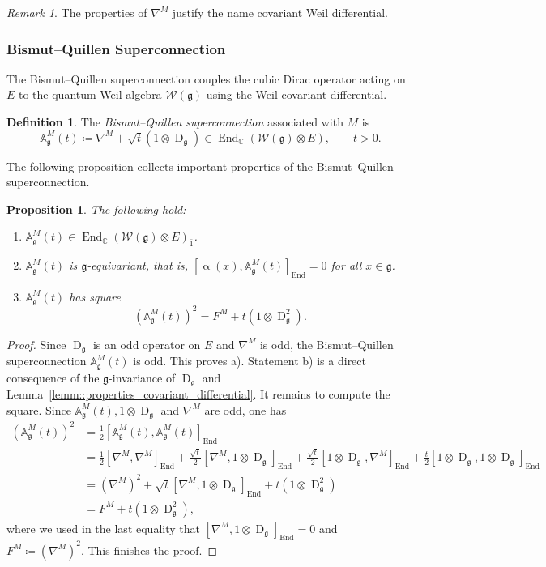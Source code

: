 \documentclass[11pt]{amsart}
\newcommand{\End}{\operatorname{End}}
\newcommand{\Dirac}{\operatorname{D}}
\def\gg{{\mathfrak{g}}}
\theoremstyle{plain}
\newtheorem{proposition}[theorem]{Proposition}
\theoremstyle{remark}
\theoremstyle{definition}
\newtheorem{definition}[theorem]{Definition}
\numberwithin{equation}{section}
\theoremstyle{remark}
\newtheorem{remark}[theorem]{Remark}
\begin{document}
\begin{remark}
 The properties of $\nabla^{M}$ justify the name covariant Weil differential.
\end{remark}

\subsubsection{Bismut--Quillen Superconnection}
The Bismut--Quillen superconnection couples the cubic Dirac operator acting on $E$ to the quantum Weil algebra $\mathcal{W}(\gg)$ using the Weil covariant differential.

\begin{definition}
 The \emph{Bismut--Quillen superconnection} associated with $M$ is 
 \[
 \mathbb{A}_{\gg}^{M}(t)\coloneqq \nabla^{M} + \sqrt{t} (1\otimes \Dirac_{\gg}) \in \End_{\mathbb{C}}(\mathcal{W}(\gg) \otimes E), \qquad t>0.
 \]
\end{definition}

The following proposition collects important properties of the Bismut--Quillen superconnection.

\begin{proposition}\label{prop::prperties_AM_absolute} The following hold:
\begin{enumerate}
\item[a)] $\mathbb{A}^{\!M}_{\gg}(t) \in \End_{\mathbb{C}}(\mathcal{W}(\gg)\otimes E)_{\bar{1}}$.
 \item[b)] $\mathbb{A}^{\!M}_{\gg}(t)$ is $\gg$-equivariant, that is, $[\upalpha(x), \mathbb{A}^{\!M}_{\gg}(t)]_{\End}=0$ for all $x \in \gg$. 
 \item[c)] $\mathbb{A}^{\!M}_{\gg}(t)$ has square 
 \[
 (\mathbb{A}_{\gg}^{\!M}(t))^{2}=F^{M} +t (1\otimes \Dirac_{\gg}^{2}).
 \]
\end{enumerate}
\end{proposition}
\begin{proof} Since $\Dirac_{\gg}$ is an odd operator on $E$ and $\nabla^{M}$ is odd, the Bismut--Quillen superconnection $\mathbb{A}^{\!M}_{\gg}(t)$ is odd. This proves a). Statement b) is a direct consequence of the $\gg$-invariance of $\Dirac_{\gg}$ and Lemma~\ref{lemm::properties_covariant_differential}. It remains to compute the square. Since $\mathbb{A}^{\!M}_{\gg}(t), 1\otimes \Dirac_{\gg}$ and $\nabla^{M}$ are odd, one has
 \[
 \begin{aligned}(\mathbb{A}^{\!M}_{\gg}(t))^{2} &=\tfrac{1}{2}[\mathbb{A}^{\!M}_{\gg}(t),\mathbb{A}^{\!M}_{\gg}(t)]_{\End} \\ &=\tfrac{1}{2}[\nabla^{M},\nabla^{M}]_{\End}+ \tfrac{\sqrt{t}}{2}[\nabla^{M},1\otimes \Dirac_{\gg}]_{\End} + \tfrac{\sqrt{t}}{2}[1\otimes \Dirac_{\gg}, \nabla^{M}]_{\End}+ \tfrac{t}{2}[1\otimes \Dirac_{\gg}, 1 \otimes \Dirac_{\gg}]_{\End} \\ &=(\nabla^{M})^{2}+\sqrt{t}[\nabla^{M},1\otimes \Dirac_{\gg}]_{\End}+t(1\otimes \Dirac_{\gg}^{2}) \\ &=F^{M}+t(1\otimes \Dirac_{\gg}^{2}),
 \end{aligned}
 \]
 where we used in the last equality that $[\nabla^{M},1\otimes \Dirac_{\gg}]_{\End}=0$ and $F^{M}\coloneqq (\nabla^{M})^{2}$.
 This finishes the proof.
\end{proof}
\end{document}
